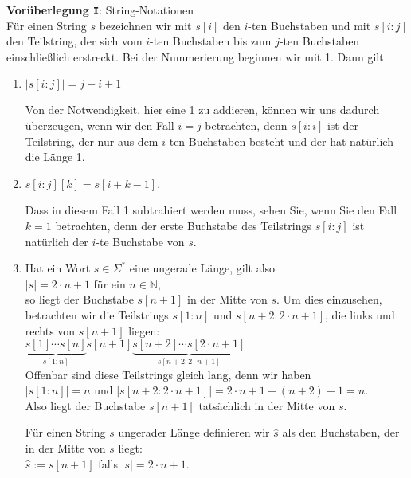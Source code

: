 \noindent
\textbf{Vor\"uberlegung \texttt{I}}: String-Notationen \\
F\"ur einen String $s$ bezeichnen wir mit $s[i]$ den $i$-ten Buchstaben und mit
$s[i\!:\!j]$ den Teilstring, der sich vom $i$-ten Buchstaben bis zum $j$-ten Buchstaben einschlie{\ss}lich
erstreckt.  Bei der Nummerierung beginnen wir mit 1.
Dann gilt
\begin{enumerate}
\item $|s[i\!:\!j]| = j - i + 1$

      Von der Notwendigkeit, hier eine 1 zu addieren, k\"onnen wir uns dadurch \"uberzeugen, wenn wir den
      Fall $i = j$ betrachten, denn $s[i\!:\!i]$ ist der Teilstring, der nur aus dem $i$-ten
      Buchstaben besteht und der hat nat\"urlich die L\"ange 1.
\item $s[i\!:\!j][k] = s[i + k - 1]$.

      Dass in diesem Fall 1 subtrahiert werden muss, sehen Sie, wenn Sie den Fall $k=1$ betrachten,
      denn der erste Buchstabe des Teilstrings $s[i\!:\!j]$ ist nat\"urlich der $i$-te
      Buchstabe von $s$.
\item Hat ein Wort $s \in \Sigma^*$ eine ungerade L\"ange, gilt also
      \\[0.2cm]
      \hspace*{1.3cm}
      $|s| = 2 \cdot n +1$ \quad f\"ur ein $n \in \mathbb{N}$,
      \\[0.2cm]
      so liegt der Buchstabe $s[n + 1]$ in der Mitte von $s$.  Um dies einzusehen,
      betrachten wir die Teilstrings $s[1:n]$ und $s[n+2:2\cdot n+1]$, die links und rechts
      von $s[n+1]$ liegen:
      \\[0.2cm]
      \hspace*{1.3cm}
      $\underbrace{s[1] \cdots s[n]}_{s[1:n]} s[n+1] \underbrace{s[n+2] \cdots s[2 \cdot n
        +1]}_{s[n+2:2\cdot n+1]}$
      \\[0.2cm]
      Offenbar sind diese Teilstrings gleich lang, denn wir haben
      \\[0.2cm]
      \hspace*{1.3cm}
      $|s[1:n]| = n$ \quad und \quad $|s[n+2:2\cdot n+1]| = 2 \cdot n + 1 - (n+2) + 1 = n$.
      \\[0.2cm]
      Also liegt der Buchstabe $s[n+1]$ tats\"achlich in der Mitte von $s$.  

      F\"ur einen String $s$ ungerader L\"ange definieren wir $\hat{s}$ als den Buchstaben,
      der in der Mitte von $s$ liegt:
      \\[0.2cm]
      \hspace*{1.3cm}
      $\hat{s} := s[n+1]$ \quad falls $|s| = 2 \cdot n + 1$.
\end{enumerate}

